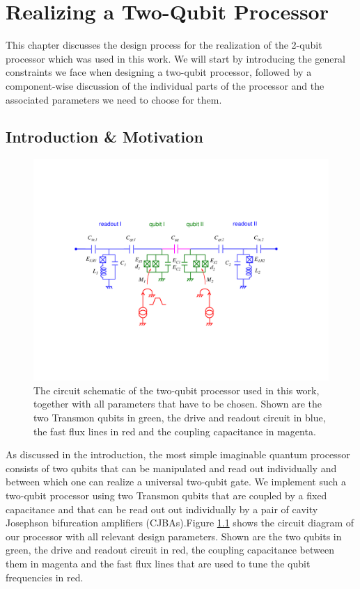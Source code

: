 \chapter{Realizing a Two-Qubit Processor} \label{chapter:design}

This chapter discusses the design process for the realization of the 2-qubit processor which was used in this work. We will start by introducing the general constraints we face when designing a two-qubit processor, followed by a component-wise discussion of the individual parts of the processor and the associated parameters we need to choose for them.

\section{Introduction \& Motivation}

\begin{figure}[ht!]
  \centering
	\includegraphics[width=1.\textwidth]{"./material/figures/2-qubit-processor/processor_schematic_parameters"}
	\caption[Circuit schematic of the two-qubit processor]{The circuit schematic of the two-qubit processor used in this work, together with all parameters that have to be chosen. Shown are the two Transmon qubits in green, the drive and readout circuit in blue, the fast flux lines in red and the coupling capacitance in magenta.}
	\label{fig:2_qubit_chip_circuit_diagram}
\end{figure}

As discussed in the introduction, the most simple imaginable quantum processor consists of two qubits that can be manipulated and read out individually and between which one can realize a universal two-qubit gate. We implement such a two-qubit processor using two Transmon qubits that are coupled by a fixed capacitance and that can be read out out individually by a pair of cavity Josephson bifurcation amplifiers (CJBAs).Figure \ref{fig:2_qubit_chip_circuit_diagram} shows the circuit diagram of our processor with all relevant design parameters. Shown are the two qubits in green, the drive and readout circuit in red, the coupling capacitance between them in magenta and the fast flux lines that are used to tune the qubit frequencies in red.

